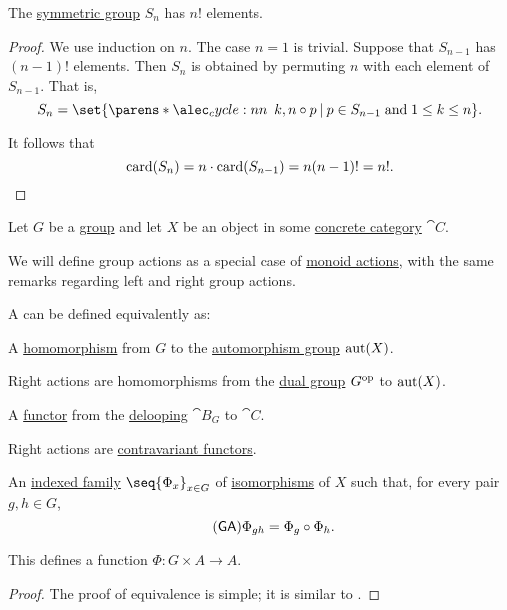 \begin{proposition}\label{thm:symmetric_group_cardinality}
  The \hyperref[def:symmetric_group]{symmetric group} \( S_n \) has \( n! \) elements.
\end{proposition}
\begin{proof}
  We use induction on \( n \). The case \( n = 1 \) is trivial. Suppose that \( S_{n-1} \) has \( (n-1)! \) elements. Then \( S_n \) is obtained by permuting \( n \) with each element of \( S_{n-1} \). That is,
  \begin{equation*}
    S_n = \set{ \cycle{ k, n } \bincirc p \given p \in S_{n-1} \T{and} 1 \leq k \leq n }.
  \end{equation*}

  It follows that
  \begin{equation*}
    \operatorname{card}(S_n) = n \cdot \operatorname{card}(S_{n-1}) = n (n-1)! = n!.
  \end{equation*}
\end{proof}

\begin{definition}\label{def:group_action}
  Let \( G \) be a \hyperref[def:group]{group} and let \( X \) be an object in some \hyperref[def:concrete_category]{concrete category} \( \cat{C} \).

  We will define group actions as a special case of \hyperref[def:monoid_action]{monoid actions}, with the same remarks regarding left and right group actions.

  A  can be defined equivalently as:
  \begin{thmenum}
     A \hyperref[def:group/homomorphism]{homomorphism} from \( G \) to the \hyperref[def:automorphism_group]{automorphism group} \( \operatorname{aut}(X) \).

    Right actions are homomorphisms from the \hyperref[def:monoid/duality]{dual group} \( G^{\operatorname{op}} \) to \( \operatorname{aut}(X) \).

     A \hyperref[def:functor]{functor} from the \hyperref[def:monoid_delooping]{delooping} \( \cat{B}_G \) to \( \cat{C} \).

    Right actions are \hyperref[rem:contravariant_functor]{contravariant functors}.

     An \hyperref[def:cartesian_product/indexed_family]{indexed family} \( \seq{ \Phi_x }_{x \in G} \) of \hyperref[def:morphism_invertibility/isomorphism]{isomorphisms} of \( X \) such that, for every pair \( g, h \in G \),
    \begin{equation}\label{eq:def:group_action/family/compatibility}\tag{\logic{GA}}
      \Phi_{gh} = \Phi_g \bincirc \Phi_h.
    \end{equation}

    This defines a function \( \Phi: G \times A \to A \).
  \end{thmenum}
\end{definition}
\begin{proof}
  The proof of equivalence is simple; it is similar to .
\end{proof}


